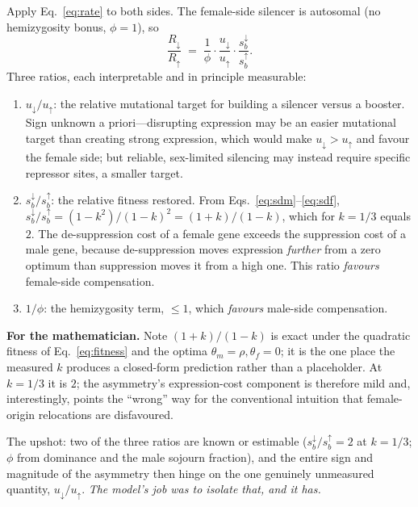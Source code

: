 \documentclass[11pt,a4paper]{article}
\begin{document}
Apply Eq.~\eqref{eq:rate} to both sides. The female-side silencer is autosomal (no hemizygosity bonus, $\phi=1$), so
\begin{equation}
\frac{R_{\downarrow}}{R_{\uparrow}} \;=\; \frac{1}{\phi}\cdot\frac{u_{\downarrow}}{u_{\uparrow}}\cdot\frac{s_b^{\downarrow}}{s_b^{\uparrow}}.
\label{eq:asym_resident}
\end{equation}
Three ratios, each interpretable and in principle measurable:
\begin{enumerate}
\item $u_{\downarrow}/u_{\uparrow}$: the relative mutational target for building a silencer versus a booster. Sign unknown a priori---disrupting expression may be an easier mutational target than creating strong expression, which would make $u_{\downarrow}>u_{\uparrow}$ and favour the female side; but reliable, sex-limited silencing may instead require specific repressor sites, a smaller target.
\item $s_b^{\downarrow}/s_b^{\uparrow}$: the relative fitness restored. From Eqs.~\eqref{eq:sdm}--\eqref{eq:sdf}, $s_b^{\downarrow}/s_b^{\uparrow}=(1-k^2)/(1-k)^2 = (1+k)/(1-k)$, which for $k=1/3$ equals $2$. The de-suppression cost of a female gene exceeds the suppression cost of a male gene, because de-suppression moves expression \emph{further} from a zero optimum than suppression moves it from a high one. This ratio \emph{favours} female-side compensation.
\item $1/\phi$: the hemizygosity term, $\le 1$, which \emph{favours} male-side compensation.
\end{enumerate}

\begin{checkpoint}
\textbf{For the mathematician.} Note $(1+k)/(1-k)$ is exact under the quadratic fitness of Eq.~\eqref{eq:fitness} and the optima $\theta_m=\rho,\theta_f=0$; it is the one place the measured $k$ produces a closed-form prediction rather than a placeholder. At $k=1/3$ it is $2$; the asymmetry's expression-cost component is therefore mild and, interestingly, points the ``wrong'' way for the conventional intuition that female-origin relocations are disfavoured.
\end{checkpoint}

The upshot: two of the three ratios are known or estimable ($s_b^{\downarrow}/s_b^{\uparrow}=2$ at $k=1/3$; $\phi$ from dominance and the male sojourn fraction), and the entire sign and magnitude of the asymmetry then hinge on the one genuinely unmeasured quantity, $u_{\downarrow}/u_{\uparrow}$. \emph{The model's job was to isolate that, and it has.}
\end{document}
